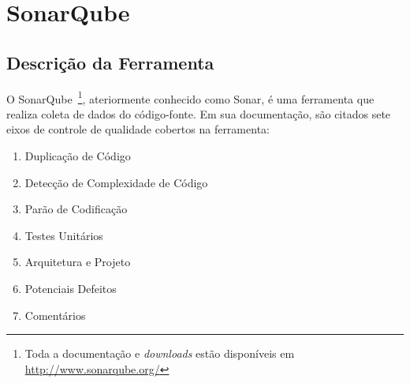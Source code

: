 \chapter{SonarQube}


\section {Descrição da Ferramenta}
O SonarQube~\footnote{Toda a documentação e \textit{downloads} estão disponíveis em \url{http://www.sonarqube.org/}}, ateriormente conhecido como Sonar, é uma ferramenta que realiza coleta de dados do código-fonte. Em sua documentação, são citados sete eixos de controle de qualidade cobertos na ferramenta: 

\begin{enumerate}
  \item Duplicação de Código
  \item Detecção de Complexidade de Código
  \item Parão de Codificação
  \item Testes Unitários
  \item Arquitetura e Projeto
  \item Potenciais Defeitos
  \item Comentários
\end{enumerate}

